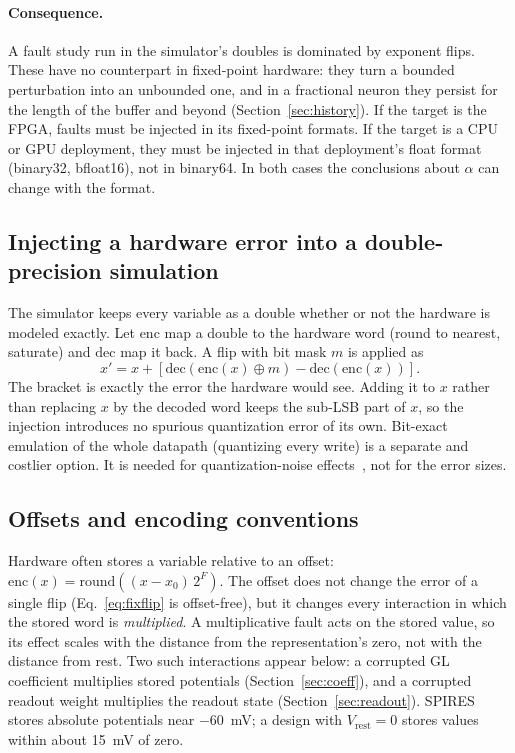 \documentclass[11pt,a4paper]{article}
\newcommand{\enc}{\mathrm{enc}}
\newcommand{\dec}{\mathrm{dec}}
\begin{document}
\paragraph{Consequence.} A fault study run in the simulator's doubles is dominated by exponent flips. These have no counterpart in fixed-point hardware: they turn a bounded perturbation into an unbounded one, and in a fractional neuron they persist for the length of the buffer and beyond (Section~\ref{sec:history}). If the target is the FPGA, faults must be injected in its fixed-point formats. If the target is a CPU or GPU deployment, they must be injected in that deployment's float format (binary32, bfloat16), not in binary64. In both cases the conclusions about $\alpha$ can change with the format.

\subsection{Injecting a hardware error into a double-precision simulation}
\label{sec:delta}

The simulator keeps every variable as a double whether or not the hardware is modeled exactly. Let $\enc$ map a double to the hardware word (round to nearest, saturate) and $\dec$ map it back. A flip with bit mask $m$ is applied as
\begin{equation}
x' = x + \left[ \dec\!\left( \enc(x) \oplus m \right) - \dec\!\left( \enc(x) \right) \right].
\label{eq:delta}
\end{equation}
The bracket is exactly the error the hardware would see. Adding it to $x$ rather than replacing $x$ by the decoded word keeps the sub-LSB part of $x$, so the injection introduces no spurious quantization error of its own. Bit-exact emulation of the whole datapath (quantizing every write) is a separate and costlier option. It is needed for quantization-noise effects~\cite{dropout2026}, not for the error sizes.

\subsection{Offsets and encoding conventions}

Hardware often stores a variable relative to an offset: $\enc(x) = \mathrm{round}((x - x_0)\,2^{F})$. The offset does not change the error of a single flip (Eq.~\eqref{eq:fixflip} is offset-free), but it changes every interaction in which the stored word is \emph{multiplied}. A multiplicative fault acts on the stored value, so its effect scales with the distance from the representation's zero, not with the distance from rest. Two such interactions appear below: a corrupted GL coefficient multiplies stored potentials (Section~\ref{sec:coeff}), and a corrupted readout weight multiplies the readout state (Section~\ref{sec:readout}). SPIRES stores absolute potentials near $-60$~mV; a design with $V_{\mathrm{rest}} = 0$ stores values within about 15~mV of zero.
\end{document}
